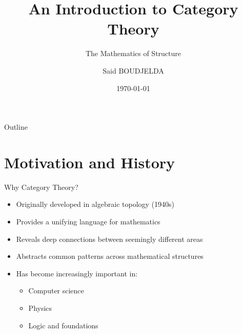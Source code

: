 \documentclass{beamer}
\title{An Introduction to Category Theory}
\subtitle{The Mathematics of Structure}
\author{Said BOUDJELDA}
\institute{Paris pantheon-assas University}
\date{\today}
\begin{document}
\begin{frame}
    \titlepage
\end{frame}

\begin{frame}{Outline}
    \tableofcontents
\end{frame}

\section{Motivation and History}

\begin{frame}{Why Category Theory?}
    \begin{itemize}
        \item Originally developed in algebraic topology (1940s)
        \item Provides a unifying language for mathematics
        \item Reveals deep connections between seemingly different areas
        \item Abstracts common patterns across mathematical structures
        \item Has become increasingly important in:
            \begin{itemize}
                \item Computer science
                \item Physics
                \item Logic and foundations
            \end{itemize}
    \end{itemize}
\end{frame}
\end{document}
